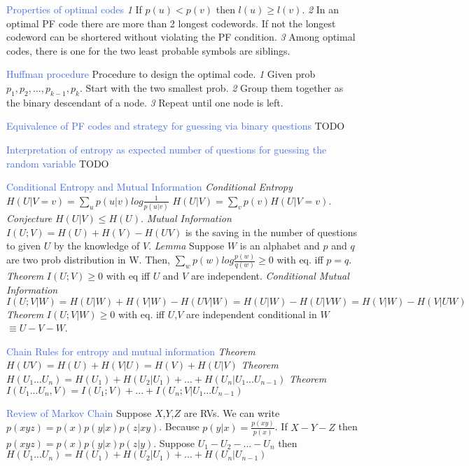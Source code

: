 \documentclass[10pt,a4paper,landscape]{article}
\newcommand{\concept}[1]{\textcolor{RoyalBlue}{#1}}
\newcommand{\subconcept}[1]{\textcolor{PineGreen}{\textit{#1}}}
\renewcommand{\section}[1]{
    \vspace{-0.3cm}
    \begin{center}
      \color{Bittersweet}
      \hrulefill{\small~~#1~~}\hrulefill
    \end{center}
    \vspace{-0.3cm}
  }
\begin{document}
\begin{multicols*}{4}
\concept{Properties of optimal codes} 
\subconcept{1} If $p(u) < p(v)$ then $l(u) \ge l(v)$.
\subconcept{2} In an optimal PF code there are more than 2 longest codewords. If not the longest codeword can be shortered without violating the PF condition.
\subconcept{3} Among optimal codes, there is one for the two least probable symbols are siblings.

\concept{Huffman procedure} 
Procedure to design the optimal code.
\subconcept{1} Given prob $p_1,p_2,...,p_{k-1},p_k$. Start with the two smallest prob.
\subconcept{2} Group them together as the binary descendant of a node.
\subconcept{3} Repeat until one node is left.

\concept{Equivalence of PF codes and strategy for guessing via binary questions} TODO

\concept{Interpretation of entropy as expected number of questions for guessing the random variable} TODO

\section{Mutual Information}

\concept{Conditional Entropy and Mutual Information} 
\subconcept{Conditional Entropy} $H(U|V=v)=\sum_{u}p(u|v)log \frac{1}{p(u|v)}$
$H(U|V)=\sum_{v}p(v)H(U|V=v)$.
\subconcept{Conjecture} $H(U|V) \le H(U)$.
\subconcept{Mutual Information} $I(U;V)=H(U)+H(V)-H(UV)$ is the saving in the number of questions to given $U$ by the knowledge of $V$.
\subconcept{Lemma} Suppose $W$ is an alphabet and $p$ and $q$ are two prob distribution in W. Then, $\sum_{w}p(w)log \frac{p(w)}{q(w)} \ge 0$ with eq. iff $p=q$.
\subconcept{Theorem} $I(U;V)\ge 0$ with eq iff $U$ and $V$ are independent.
\subconcept{Conditional Mutual Information} 
$I(U;V|W)=H(U|W)+H(V|W)-H(UV|W)=H(U|W)-H(U|VW)=H(V|W)-H(V|UW)$
\subconcept{Theorem} $I(U;V|W)\ge 0$ with eq. iff $U$,$V$ are independent conditional in $W$ $\equiv U - V - W$.

\concept{Chain Rules for entropy and mutual information} 
\subconcept{Theorem} $H(UV)=H(U)+H(V|U)=H(V)+H(U|V)$
\subconcept{Theorem} $H(U_1...U_n)=H(U_1)+H(U_2|U_1)+...+H(U_n|U_1...U_{n-1})$
\subconcept{Theorem} $I(U_1...U_n,V)=I(U_1;V)+...+I(U_n;V|U_1...U_{n-1})$
 
\concept{Review of Markov Chain} 
Suppose $X$,$Y$,$Z$ are RVs. We can write $p(xyz)=p(x)p(y|x)p(z|xy)$.
Because $p(y|x)=\frac{p(xy)}{p(x)}$.
If $X-Y-Z$ then $p(xyz)=p(x)p(y|x)p(z|y)$. 
Suppose $U_1-U_2-...-U_n$ then $H(U_1...U_n)=H(U_1)+H(U_2|U_1)+...+H(U_n|U_{n-1})$


\end{multicols*}
\end{document}
